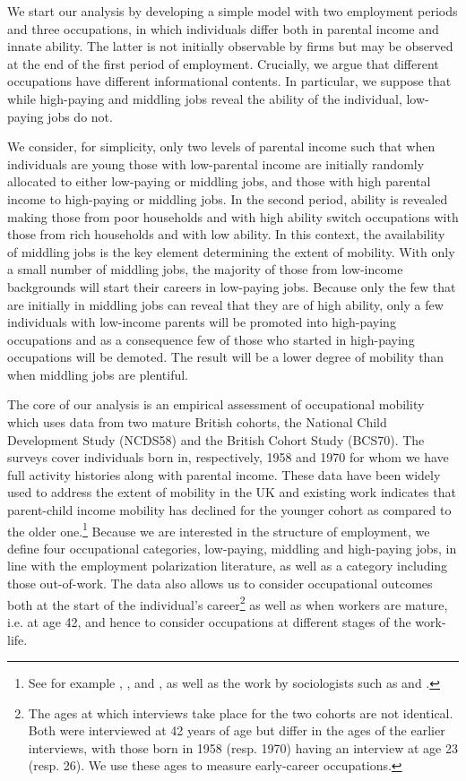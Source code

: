 We start our analysis by developing a simple model with two employment periods and three occupations, in which individuals differ both in parental income and innate ability. The latter is not initially observable by firms but may be observed at the end of the first period of employment. Crucially, we argue that different occupations have different informational contents. In particular, we suppose that while high-paying and middling jobs reveal the ability of the individual, low-paying jobs do not. 

We consider, for simplicity, only two levels of parental income such that when individuals are young those with low-parental income are initially randomly allocated to either low-paying or middling jobs, and those with high parental income to high-paying or middling jobs. In the second period, ability is revealed making those from poor households and with high ability switch occupations with those from rich households and with low ability. In this context, the availability of middling jobs is the key element determining the extent of mobility. With only a small number of middling jobs, the majority of those from low-income backgrounds will start their careers in low-paying jobs. Because only the few that are initially in middling jobs can reveal that they are of high ability, only a few individuals with low-income parents will be promoted into high-paying occupations and as a consequence few of those who started in high-paying occupations will be demoted. The result will be a lower degree of mobility than when middling jobs are plentiful.

The core of our analysis is an empirical assessment of occupational mobility which uses data from two mature British cohorts, the National Child Development Study (NCDS58) and the British Cohort Study (BCS70). The surveys cover individuals born in, respectively, 1958 and 1970 for whom we have full activity histories along with parental income. These data have been widely used to address the extent of mobility in the UK and existing work indicates that parent-child income mobility has declined for the younger cohort as compared to the older one.\footnote{See for example \citet{Blanden2007Accounting}, \citet{Nicoletti2007Intergenerational}, and \citet{Blanden2013Intergenerational}, as well as the work by sociologists such as \citet{Goldthorpe2007Intergenerational} and \citet{Erikson2010Social}.} Because we are interested in the structure of employment, we define four occupational categories, low-paying, middling and high-paying jobs, in line with the employment polarization literature, as well as a category including those out-of-work. The data also allows us to consider occupational outcomes both at the start of the individual's career\footnote{The ages at which interviews take place for the two cohorts are not identical. Both were interviewed at 42 years of age but differ in the ages of the earlier interviews, with those born in 1958 (resp. 1970) having an interview at age 23 (resp. 26). We use these ages to measure early-career occupations.} as well as when workers are mature, i.e. at age 42, and hence to consider occupations at different stages of the work-life.


